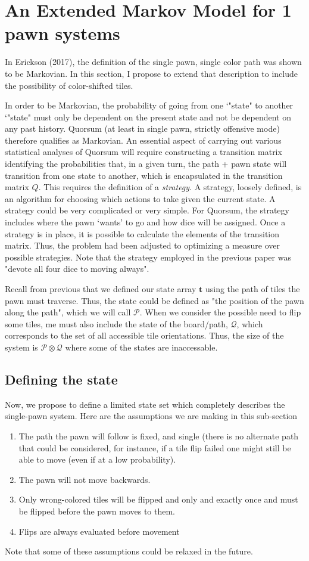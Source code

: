 \documentclass[letterpaper]{article}
\begin{document}
\section{An Extended Markov Model for 1 pawn systems}
In Erickson (2017), the definition of the single pawn, single color path was
shown to be Markovian.  In this section, I propose to extend that description
to include the possibility of color-shifted tiles.

In order to be Markovian, the probability of going from one `"state" to another
`"state" must only be dependent on the present state and not be dependent on
any past history.  Quorsum (at least in single pawn, strictly offensive mode)
therefore qualifies as Markovian.  An essential aspect of carrying out various
statistical analyses of Quorsum will require constructing a transition matrix
identifying the probabilities that, in a given turn, the path + pawn state will
transition from one state to another, which is encapsulated in the transition
matrix $Q$.  This requires the definition of a \textit{strategy}.  A strategy,
loosely defined, is an algorithm for choosing which actions to take given the 
current state.  A strategy could be very complicated or very simple.  For
Quorsum, the strategy includes where the pawn `wants' to go and how dice will
be assigned.  Once a strategy is in place, it is possible to calculate the
elements of the transition matrix.  Thus, the problem had been adjusted to
optimizing a measure over possible strategies.  Note that the strategy
employed in the previous paper was "devote all four dice to moving always".

Recall from previous that we defined our state array $\mathbf{t}$ using the path
of tiles the pawn must traverse.  Thus, the state could be defined as "the
position of the pawn along the path", which we will call $\mathcal{P}$.  When
we consider the possible need to flip some tiles, me must also include the 
state of the board/path, $\mathcal{Q}$, which corresponds to the set of all 
accessible tile orientations.  Thus, the size of the system is $\mathcal{P}
\otimes \mathcal{Q}$ where some of the states are inaccessable.

\subsection{Defining the state}
Now, we propose to define a limited state set which completely describes the
single-pawn system.  Here are the assumptions we are making in this sub-section
\begin{enumerate}
	\item The path the pawn will follow is fixed, and single (there is no
		alternate path that could be considered, for instance, if a
		tile flip failed one might still be able to move (even if at
		a low probability).
	\item The pawn will not move backwards.
	\item Only wrong-colored tiles will be flipped and only and exactly
		once and must be flipped before the pawn moves to them.
	\item Flips are always evaluated before movement
\end{enumerate}
Note that some of these assumptions could be relaxed in
the future.  
\end{document}

